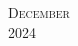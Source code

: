 \documentclass[10pt]{article} %
\begin{document}


\begin{center}
	\textsc{\LARGE December}\\ %
	\textsc{\large 2024} %
\end{center}


\begin{calendar}{\textwidth} %








\end{calendar}
\end{document}
